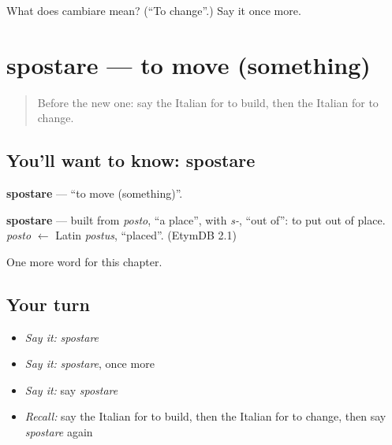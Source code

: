 \begin{tcolorbox}[breakable,colback=teal!4,colframe=teal!35!black,title={Before you move on}]
What does cambiare mean? (\textquotedblleft{}To change\textquotedblright{}.) Say it once more.
\end{tcolorbox}
\section[spostare]{spostare — to move (something)}

\label{lesson:IT-C234-spostare}



\begin{quote}
Before the new one: say the Italian for to build, then the Italian for to change.
\end{quote}

\subsection*{You'll want to know: spostare}
\textbf{spostare} — \textquotedblleft{}to move (something)\textquotedblright{}.

\begin{cousinweb}
\textbf{spostare} — built from \emph{posto}, \textquotedblleft{}a place\textquotedblright{}, with \emph{s-}, \textquotedblleft{}out of\textquotedblright{}: to put out of place. \emph{posto} $\leftarrow$ Latin \emph{postus}, \textquotedblleft{}placed\textquotedblright{}. (EtymDB 2.1)
\end{cousinweb}

\begin{grammarlens}[title={What you've built}]
One more word for this chapter.
\end{grammarlens}

\subsection*{Your turn}
\begin{itemize}
\raggedright
  \item \emph{Say it:} \emph{spostare}
  \item \emph{Say it:} \emph{spostare}, once more
  \item \emph{Say it:} say \emph{spostare}
  \item \emph{Recall:} say the Italian for to build, then the Italian for to change, then say \emph{spostare} again
\end{itemize}

